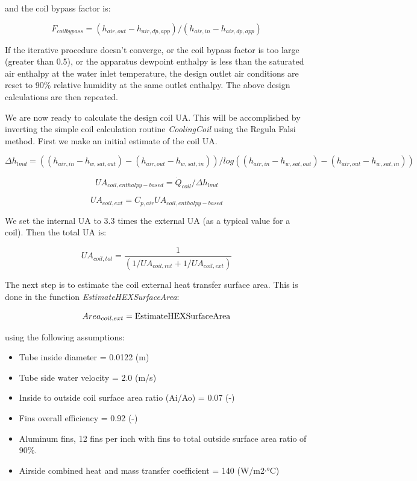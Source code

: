 and the coil bypass factor is:

\begin{equation}
{F_{coilbypass}} = ({h_{air,out}} - {h_{air,dp,app}})/({h_{air,in}} - {h_{air,dp,app}})
\end{equation}

If the iterative procedure doesn't converge, or the coil bypass factor is too large (greater than 0.5), or the apparatus dewpoint enthalpy is less than the saturated air enthalpy at the water inlet temperature, the design outlet air conditions are reset to 90\% relative humidity at the same outlet enthalpy. The above design calculations are then repeated.

We are now ready to calculate the design coil UA. This will be accomplished by inverting the simple coil calculation routine \emph{CoolingCoil} using the Regula Falsi method. First we make an initial estimate of the coil UA.

\begin{equation}
\Delta {h_{lmd}} = (({h_{air,in}} - {h_{w,sat,out}}) - ({h_{air,out}} - {h_{w,sat,in}}))/log(({h_{air,in}} - {h_{w,sat,out}}) - ({h_{air,out}} - {h_{w,sat,in}}))
\end{equation}

\begin{equation}
U{A_{coil,enthalpy - based}} = {\dot Q_{coil}}/\Delta {h_{lmd}}
\end{equation}

\begin{equation}
U{A_{coil,ext}} = {C_{p,air}}U{A_{coil,enthalpy - based}}
\end{equation}

We set the internal UA to 3.3 times the external UA (as a typical value for a coil). Then the total UA is:

\begin{equation}
  UA_{coil,tot} = \frac{1}{{(1/U{A_{coil,int}} + 1/U{A_{coil,ext}})}}
\end{equation}

The next step is to estimate the coil external heat transfer surface area. This is done in the function \emph{EstimateHEXSurfaceArea}:

\begin{equation}
Are{a_{coil,ext}} = {\rm{EstimateHEXSurfaceArea}}
\end{equation}

using the following assumptions:

\begin{itemize}
\item
  Tube inside diameter = 0.0122 (m)
\item
  Tube side water velocity = 2.0 (m/s)
\item
  Inside to outside coil surface area ratio (Ai/Ao) = 0.07 (-)
\item
  Fins overall efficiency = 0.92 (-)
\item
  Aluminum fins, 12 fins per inch with fins to total outside surface area ratio of 90\%.
\item
  Airside combined heat and mass transfer coefficient = 140 (W/m2∙°C)
\end{itemize}


